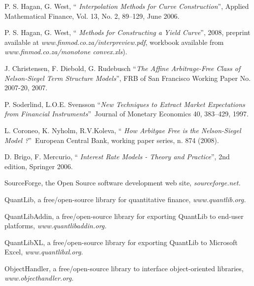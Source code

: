 \documentclass[11pt,reqno]{amsart}
\begin{document}
\begin{thebibliography}{99}

 P. S. Hagan, G. West, \textquotedblleft \textit{%
Interpolation Methods for Curve Construction}\textquotedblright , Applied
Mathematical Finance, Vol. 13, No. 2, 89--129, June 2006.

 P. S. Hagan, G. West, \textquotedblleft \textit{%
Methods for Constructing a Yield Curve}\textquotedblright , 2008, preprint
available at \textit{www.finmod.co.za/interpreview.pdf}, workbook available
from \textit{www.finmod.co.za/monotone convex.xls}).

 J. Christensen, F. Diebold, G. Rudebusch
\textquotedblleft \textit{The Affine Arbitrage-Free Class of Nelson-Siegel
Term Structure Models}\textquotedblright , FRB of San Francisco Working
Paper No. 2007-20, 2007.

 P. Soderlind, L.O.E. Svensson
\textquotedblleft \textit{New Techniques to Extract Market Expectations from
Financial Instruments}\textquotedblright\ Journal of Monetary Economics 40,
383--429, 1997.

 L. Coroneo, K. Nyholm, R.V.Koleva, \textquotedblleft
\textit{How Arbitgae Free is the Nelson-Siegel Model ?}\textquotedblright\
European Central Bank, working paper series, n. 874 (2008).

 D. Brigo, F. Mercurio, \textquotedblleft \textit{%
Interest Rate Models - Theory and Practice}\textquotedblright , 2nd edition,
Springer 2006.

 SourceForge, the Open Source software development web
site, \textit{sourceforge.net.}

 QuantLib, a free/open-source library for quantitative
finance, \textit{www.quantlib.org.}

 QuantLibAddin, a free/open-source library for
exporting QuantLib to end-user platforms, \textit{www.quantlibaddin.org.}

 QuantLibXL, a free/open-source library for exporting
QuantLib to Microsoft Excel, \textit{www.quantlibxl.org.}

 ObjectHandler, a free/open-source library to
interface object-oriented libraries, \textit{www.objecthandler.org.}

\end{thebibliography}
\end{document}

